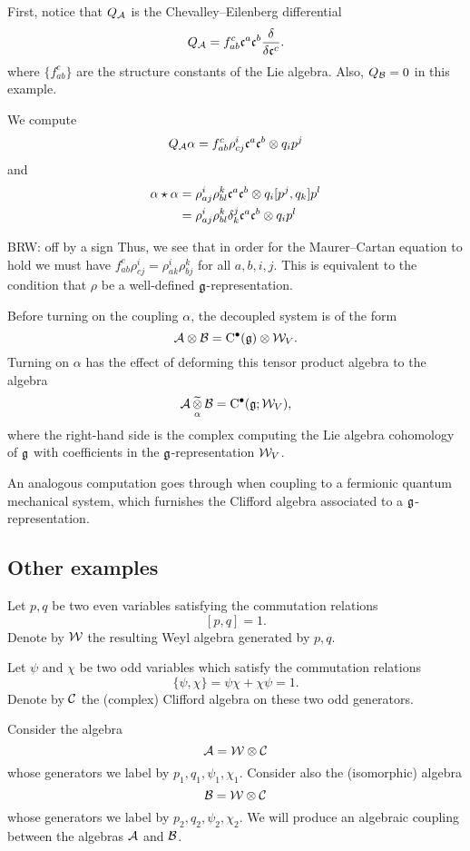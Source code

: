 \documentclass[11pt]{amsart}
\def\brian#1{{\textcolor{blue!65!red}{BRW: {#1}}}}
\begin{document}
First, notice that $Q_{\mathcal A}$ is the Chevalley--Eilenberg differential 
\[
Q_{\mathcal A} = f_{ab}^c \mathfrak c^a \mathfrak c^b \frac{\delta}{\delta \mathfrak c^c} .
\]
where $\{f_{ab}^c\}$ are the structure constants of the Lie algebra. 
Also, $Q_{\mathcal B} = 0$ in this example. 

We compute
\[
Q_{\mathcal A} \alpha = f_{ab}^c \rho_{cj}^i \mathfrak c^a \mathfrak c^b \otimes q_i p^j 
\]
and
\begin{align*}
\alpha \star \alpha & = \rho_{aj}^i \rho_{bl}^k \mathfrak c^a \mathfrak c^b \otimes q_i [p^j, q_k] p^l \\
& = \rho_{aj}^i \rho_{bl}^k \delta^j_k \mathfrak c^a \mathfrak c^b \otimes q_i p^l 
\end{align*}

\brian{off by a sign}
Thus, we see that in order for the Maurer--Cartan equation to hold we must have $f_{ab}^c \rho_{cj}^i = \rho^i_{ak} \rho^k_{bj}$ for all $a,b,i,j$. 
This is equivalent to the condition that $\rho$ be a well-defined $\mathfrak g$-representation. 

Before turning on the coupling $\alpha$, the decoupled system is of the form
\[
\mathcal A \otimes \mathcal B = {\rm C}^\bullet(\mathfrak g) \otimes \mathcal W_V . 
\]
Turning on $\alpha$ has the effect of deforming this tensor product algebra to the algebra
\[
\mathcal A \, \underset{\alpha}{\widetilde{\otimes}} \, \mathcal B = {\rm C}^\bullet(\mathfrak g ; \mathcal W_V) ,
\]
where the right-hand side is the complex computing the Lie algebra cohomology of $\mathfrak g$ with coefficients in the $\mathfrak g$-representation $\mathcal W_V$. 

An analogous computation goes through when coupling to a fermionic quantum mechanical system, which furnishes the Clifford algebra associated to a $\mathfrak g$-representation.

\subsection{Other examples}

Let $p,q$ be two even variables satisfying the commutation relations
\[
[p,q] = 1.
\]
Denote by $\mathcal W$ the resulting Weyl algebra generated by $p,q$.
 
Let $\psi$ and $\chi$ be two odd variables which satisfy the commutation relations
\[
\{\psi, \chi\} = \psi \chi + \chi \psi = 1.
\]
Denote by $\mathcal C$ the (complex) Clifford algebra on these two odd generators.

Consider the algebra 
\[
\mathcal A = \mathcal W \otimes \mathcal C 
\]
whose generators we label by $p_1,q_1,\psi_1,\chi_1$.
Consider also the (isomorphic) algebra
\[
\mathcal B = \mathcal W \otimes \mathcal C
\]
whose generators we label by $p_2,q_2,\psi_2,\chi_2$.
We will produce an algebraic coupling between the algebras $\mathcal A$ and $\mathcal B$. 
\end{document}
